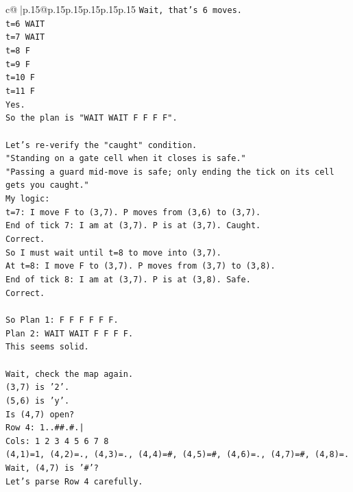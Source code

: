 \documentclass{article}
\begin{document}
{\begin{supertabular}{c@{$\;$}|p{.15\linewidth}@{}p{.15\linewidth}p{.15\linewidth}p{.15\linewidth}p{.15\linewidth}p{.15\linewidth}}
{{{\texttt{Wait, that's 6 moves.} \\
\texttt{t=6 WAIT} \\
\texttt{t=7 WAIT} \\
\texttt{t=8 F} \\
\texttt{t=9 F} \\
\texttt{t=10 F} \\
\texttt{t=11 F} \\
\texttt{Yes.} \\
\texttt{So the plan is "WAIT WAIT F F F F".} \\
\\ 
\texttt{Let's re{-}verify the "caught" condition.} \\
\texttt{"Standing on a gate cell when it closes is safe."} \\
\texttt{"Passing a guard mid{-}move is safe; only ending the tick on its cell gets you caught."} \\
\texttt{My logic:} \\
\texttt{t=7: I move F to (3,7). P moves from (3,6) to (3,7).} \\
\texttt{End of tick 7: I am at (3,7). P is at (3,7). Caught.} \\
\texttt{Correct.} \\
\texttt{So I must wait until t=8 to move into (3,7).} \\
\texttt{At t=8: I move F to (3,7). P moves from (3,7) to (3,8).} \\
\texttt{End of tick 8: I am at (3,7). P is at (3,8). Safe.} \\
\texttt{Correct.} \\
\\ 
\texttt{So Plan 1: F F F F F F.} \\
\texttt{Plan 2: WAIT WAIT F F F F.} \\
\texttt{This seems solid.} \\
\\ 
\texttt{Wait, check the map again.} \\
\texttt{(3,7) is '2'.} \\
\texttt{(5,6) is 'y'.} \\
\texttt{Is (4,7) open?} \\
\texttt{Row 4: 1..\#\#.\#.|} \\
\texttt{Cols: 1 2 3 4 5 6 7 8} \\
\texttt{(4,1)=1, (4,2)=., (4,3)=., (4,4)=\#, (4,5)=\#, (4,6)=., (4,7)=\#, (4,8)=.} \\
\texttt{Wait, (4,7) is '\#'?} \\
\texttt{Let's parse Row 4 carefully.} \\
}}}
\end{supertabular}}
\end{document}
